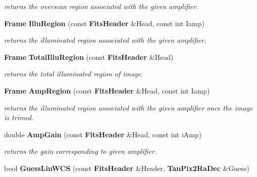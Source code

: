 \begin{CompactItemize}
\begin{CompactList}\small\item\em returns the overscan region associated with the given amplifier.\item\end{CompactList}\item 
{}
{\bf Frame} {\bf Illu\-Region} (const {\bf Fits\-Header} \&Head, const int Iamp)\label{fitstoad_cc_a27}

\begin{CompactList}\small\item\em returns the illuminated region associated with the given amplifier.\item\end{CompactList}\item 
{}
{\bf Frame} {\bf Total\-Illu\-Region} (const {\bf Fits\-Header} \&Head)\label{fitstoad_cc_a28}

\begin{CompactList}\small\item\em returns the total illuminated region of image.\item\end{CompactList}\item 
{}
{\bf Frame} {\bf Amp\-Region} (const {\bf Fits\-Header} \&Head, const int Iamp)\label{fitstoad_cc_a29}

\begin{CompactList}\small\item\em returns the illuminated region associated with the given amplifier once the image is trimed.\item\end{CompactList}\item 
{}
double {\bf Amp\-Gain} (const {\bf Fits\-Header} \&Head, const int i\-Amp)\label{fitstoad_cc_a30}

\begin{CompactList}\small\item\em returns the gain corresponding to given amplifier.\item\end{CompactList}\item 
{}
bool {\bf Guess\-Lin\-WCS} (const {\bf Fits\-Header} \&Header, {\bf Tan\-Pix2Ra\-Dec} \&Guess)\label{fitstoad_cc_a31}


\end{CompactItemize}

